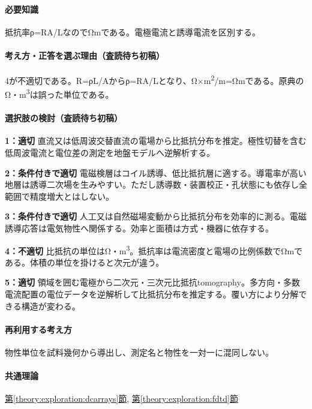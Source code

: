 \paragraph{必要知識} 抵抗率ρ=RA/LなのでΩmである。電極電流と誘導電流を区別する。

\paragraph{考え方・正答を選ぶ理由（査読待ち初稿）} 4が不適切である。R=ρL/Aからρ=RA/Lとなり、Ω×m\textsuperscript{2}/m=Ωmである。原典のΩ・m\textsuperscript{3}は誤った単位である。

\paragraph{選択肢の検討（査読待ち初稿）}\mbox{}\par

\noindent\textbf{1：適切} 直流又は低周波交替直流の電場から比抵抗分布を推定。極性切替を含む低周波電流と電位差の測定を地盤モデルへ逆解析する。\par

\noindent\textbf{2：条件付きで適切} 電磁検層はコイル誘導、低比抵抗層に適する。導電率が高い地層は誘導二次場を生みやすい。ただし誘導数・装置校正・孔状態にも依存し全範囲で精度増大とはしない。\par

\noindent\textbf{3：条件付きで適切} 人工又は自然磁場変動から比抵抗分布を効率的に測る。電磁誘導応答は電気物性へ関係する。効率と面積は方式・機器に依存する。\par

\noindent\textbf{4：不適切} 比抵抗の単位はΩ・m\textsuperscript{3}。抵抗率は電流密度と電場の比例係数でΩmである。体積の単位を掛けると次元が違う。\par

\noindent\textbf{5：適切} 領域を囲む電極から二次元・三次元比抵抗tomography。多方向・多数電流配置の電位データを逆解析して比抵抗分布を推定する。覆い方により分解できる構造が変わる。\par

\paragraph{再利用する考え方} 物性単位を試料幾何から導出し、測定名と物性を一対一に混同しない。

\paragraph{共通理論} \hyperref[theory:exploration:dcarrays]{第\ref*{theory:exploration:dcarrays}節}, \hyperref[theory:exploration:fdtd]{第\ref*{theory:exploration:fdtd}節}

